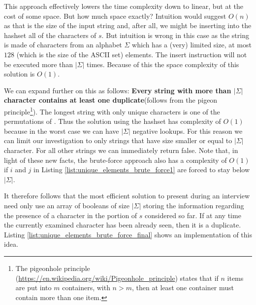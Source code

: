 This approach effectively lowers the time complexity down to linear, but at the cost of some
space. But how much space exactly? 
Intuition would suggest $O(n)$ as that is the size of the
input string and, after all,  we might be inserting into the hashset all of the characters of $s$.
But intuition is wrong in this case as the string is made of characters from an alphabet $\Sigma$ 
which has a (very) limited size, at most $128$ (which is the size of the ASCII set) elements.
The insert instruction will not be
executed more than $|\Sigma|$ times.
Because of this the space complexity of this solution is $O(1)$. 

We can expand further on this as follows: \textbf{Every string
with more than $|\Sigma|$ character contains at least one duplicate}(follows from the pigeon
principle\footnote{The pigeonhole principle (\url{https://en.wikipedia.org/wiki/Pigeonhole_principle}) states that if $n$ items are put into $m$ containers, with
$n > m$, then at least one container must contain more than one item.}). 
The longest string with only unique characters is one of the permutations of \textit{}.
Thus the solution using the hashset has complexity of $O(1)$ because in the worst case 
we can have $|\Sigma|$ negative lookups.
For this reason we can limit our investigation to only strings that have size smaller or equal to
$|\Sigma|$ character. For all other strings we can immediately return false.
Note that, in light of these new facts, the brute-force approach also has a complexity of $O(1)$
if $i$ and $j$ in Listing \ref{list:unique_elements_brute_force1} are forced to stay below
$|\Sigma|$.

It therefore follows that the most efficient solution to present during an interview need only use an
array of booleans of size $|\Sigma|$ storing the information regarding the presence of a
character in the portion of $s$ considered so far.
If at any time the currently examined character has
been already seen, then it is a duplicate.
Listing \ref{list:unique_elements_brute_force_final} shows an implementation of this idea.



